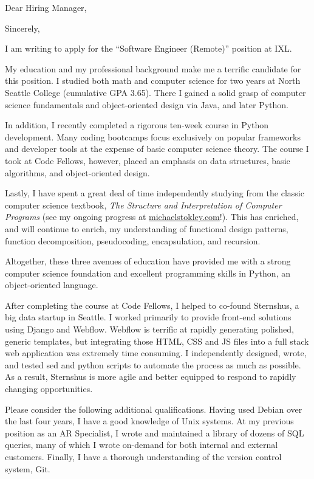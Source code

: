 \documentclass[10pt,a4paper,sans]{moderncv}        %
\begin{document}
\date{\today{}}
\opening{Dear Hiring Manager,}
\closing{Sincerely,}
\makelettertitle

I am writing to apply for the ``Software Engineer (Remote)'' position at IXL.

My education and my professional background make me a terrific candidate for
this position. I studied both math and computer science for two years at North
Seattle College (cumulative GPA 3.65). There I gained a solid grasp of computer
science fundamentals and object-oriented design via Java, and later Python.

In addition, I recently completed a rigorous ten-week course in Python
development. Many coding bootcamps focus exclusively on popular frameworks and
developer tools at the expense of basic computer science theory. The course I
took at Code Fellows, however, placed an emphasis on data structures, basic
algorithms, and object-oriented design.

Lastly, I have spent a great deal of time independently studying from the
classic computer science textbook, \textit{The Structure and Interpretation of
  Computer Programs} (see my ongoing progress at
{\href{http://michaelstokley.com}{michaelstokley.com}}!). This has enriched, and
will continue to enrich, my understanding of functional design patterns,
function decomposition, pseudocoding, encapsulation, and recursion.

Altogether, these three avenues of education have provided me with a strong
computer science foundation and excellent programming skills in Python, an
object-oriented language.

After completing the course at Code Fellows, I helped to co-found Sternshus, a
big data startup in Seattle. I worked primarily to provide front-end solutions
using Django and Webflow. Webflow is terrific at rapidly generating polished,
generic templates, but integrating those HTML, CSS and JS files into a full
stack web application was extremely time consuming. I independently designed,
wrote, and tested sed and python scripts to automate the process as much as
possible. As a result, Sternshus is more agile and better equipped to respond to
rapidly changing opportunities.

Please consider the following additional qualifications. Having used Debian over
the last four years, I have a good knowledge of Unix systems. At my previous
position as an AR Specialist, I wrote and maintained a library of dozens of SQL
queries, many of which I wrote on-demand for both internal and external
customers. Finally, I have a thorough understanding of the version control
system, Git.
\end{document}

